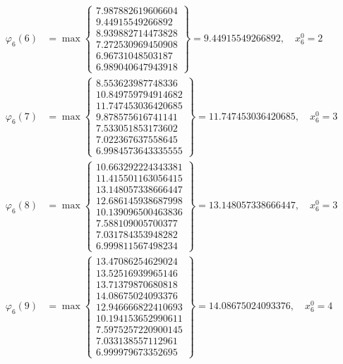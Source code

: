 \documentclass{article}
\begin{document}
\begin{align*}
  
\varphi_{6}(6) &= \max \left\{ \begin{array}{c}
7.987882619606604 \\
 9.44915549266892 \\
 8.939882714473828 \\
 7.272530969450908 \\
 6.96731048503187 \\
 6.989040647943918
\end{array} \right\} = 9.44915549266892, \quad x_{6}^0 = 2\\
  
  
  
  
\varphi_{6}(7) &= \max \left\{ \begin{array}{c}
8.553623987748336 \\
 10.849759794914682 \\
 11.747453036420685 \\
 9.878575616741141 \\
 7.533051853173602 \\
 7.022367637558645 \\
 6.9984573643335555
\end{array} \right\} = 11.747453036420685, \quad x_{6}^0 = 3\\
  
  
  
  
\varphi_{6}(8) &= \max \left\{ \begin{array}{c}
10.663292224343381 \\
 11.415501163056415 \\
 13.148057338666447 \\
 12.686145938687998 \\
 10.139096500463836 \\
 7.588109005700377 \\
 7.031784353948282 \\
 6.999811567498234
\end{array} \right\} = 13.148057338666447, \quad x_{6}^0 = 3\\
  
  
  
  
\varphi_{6}(9) &= \max \left\{ \begin{array}{c}
13.47086254629024 \\
 13.52516939965146 \\
 13.71379870680818 \\
 14.08675024093376 \\
 12.946666822410693 \\
 10.194153652990611 \\
 7.5975257220900145 \\
 7.033138557112961 \\
 6.999979673352695
\end{array} \right\} = 14.08675024093376, \quad x_{6}^0 = 4\\
  

\end{align*}
\end{document}
